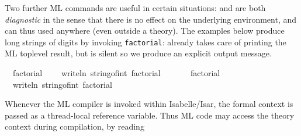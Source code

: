 \begin{isabellebody}
\begin{isamarkuptext}
  \medskip Two further ML commands are useful in certain situations:
  \hyperlink{command.ML-val}{\mbox{}} and \hyperlink{command.ML-command}{\mbox{}} are both
  \emph{diagnostic} in the sense that there is no effect on the
  underlying environment, and can thus used anywhere (even outside a
  theory).  The examples below produce long strings of digits by
  invoking \verb|factorial|: \hyperlink{command.ML-val}{\mbox{}} already takes care of
  printing the ML toplevel result, but \hyperlink{command.ML-command}{\mbox{}} is silent
  so we produce an explicit output message.%
\end{isamarkuptext}%
\isamarkuptrue%
%
\isadelimML
%
\endisadelimML
%
\isatagML
{}\isamarkupfalse%
\ {\isacharverbatimopen}\ factorial\ {}{}{}\ {\isacharverbatimclose}\isanewline
{}\isamarkupfalse%
\ {\isacharverbatimopen}\ writeln\ {\isacharparenleft}string{\isacharunderscore}of{\isacharunderscore}int\ {\isacharparenleft}factorial\ {}{}{}{\isacharparenright}{\isacharparenright}\ {\isacharverbatimclose}%
\endisatagML
{\isafoldML}%
%
\isadelimML
%
\endisadelimML
\isanewline
\isanewline
{}\isamarkupfalse%
\isanewline
%
\isadelimML
\ \ %
\endisadelimML
%
\isatagML
{}\isamarkupfalse%
\ {\isacharverbatimopen}\ factorial\ {}{}{}\ {\isacharverbatimclose}\ \ \isanewline
\ \ \isamarkupfalse%
\ {\isacharverbatimopen}\ writeln\ {\isacharparenleft}string{\isacharunderscore}of{\isacharunderscore}int\ {\isacharparenleft}factorial\ {}{}{}{\isacharparenright}{\isacharparenright}\ {\isacharverbatimclose}%
\endisatagML
{\isafoldML}%
%
\isadelimML
\isanewline
%
\endisadelimML
%
\isadelimproof
%
\endisadelimproof
%
\isatagproof
{}\isamarkupfalse%
%
\endisatagproof
{\isafoldproof}%
%
\isadelimproof
%
\endisadelimproof
%
\isamarkuptrue%
%
\begin{isamarkuptext}%
Whenever the ML compiler is invoked within Isabelle/Isar, the
  formal context is passed as a thread-local reference variable.  Thus
  ML code may access the theory context during compilation, by reading

\end{isamarkuptext}
\end{isabellebody}
